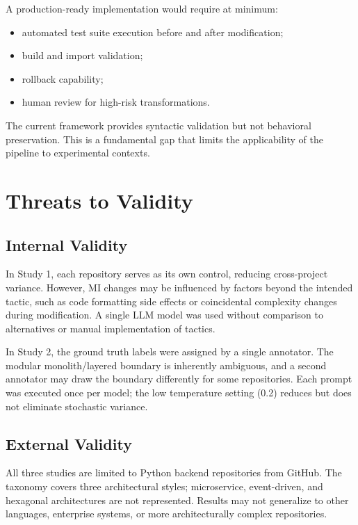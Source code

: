 A production-ready implementation would require at minimum:
\begin{itemize}
    \item automated test suite execution before and after modification;
    \item build and import validation;
    \item rollback capability;
    \item human review for high-risk transformations.
\end{itemize}

The current framework provides syntactic validation but not behavioral preservation. This is a fundamental gap that limits the applicability of the pipeline to experimental contexts.

\section{Threats to Validity}
\label{sec:eval_threats}

\subsection{Internal Validity}

In Study 1, each repository serves as its own control, reducing cross-project variance. However, MI changes may be influenced by factors beyond the intended tactic, such as code formatting side effects or coincidental complexity changes during modification. A single LLM model was used without comparison to alternatives or manual implementation of tactics.

In Study 2, the ground truth labels were assigned by a single annotator. The modular monolith/layered boundary is inherently ambiguous, and a second annotator may draw the boundary differently for some repositories. Each prompt was executed once per model; the low temperature setting (0.2) reduces but does not eliminate stochastic variance.

\subsection{External Validity}

All three studies are limited to Python backend repositories from GitHub. The taxonomy covers three architectural styles; microservice, event-driven, and hexagonal architectures are not represented. Results may not generalize to other languages, enterprise systems, or more architecturally complex repositories.


